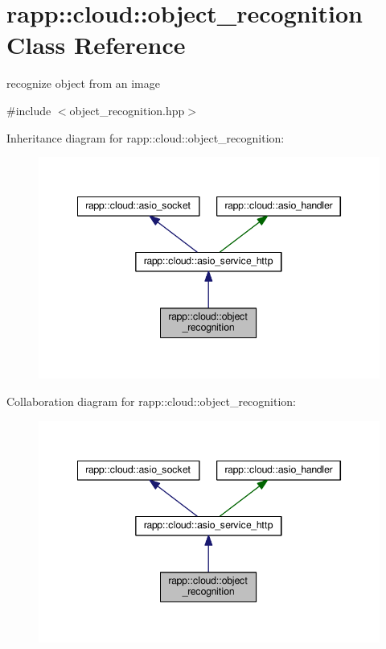 \hypertarget{classrapp_1_1cloud_1_1object__recognition}{\section{rapp\-:\-:cloud\-:\-:object\-\_\-recognition Class Reference}
\label{classrapp_1_1cloud_1_1object__recognition}
}


recognize object from an image  




{\ttfamily \#include $<$object\-\_\-recognition.\-hpp$>$}



Inheritance diagram for rapp\-:\-:cloud\-:\-:object\-\_\-recognition\-:
\nopagebreak
\begin{figure}[H]
\begin{center}
\leavevmode
\includegraphics[width=345pt]{classrapp_1_1cloud_1_1object__recognition__inherit__graph}
\end{center}
\end{figure}


Collaboration diagram for rapp\-:\-:cloud\-:\-:object\-\_\-recognition\-:
\nopagebreak
\begin{figure}[H]
\begin{center}
\leavevmode
\includegraphics[width=345pt]{classrapp_1_1cloud_1_1object__recognition__coll__graph}
\end{center}
\end{figure}
